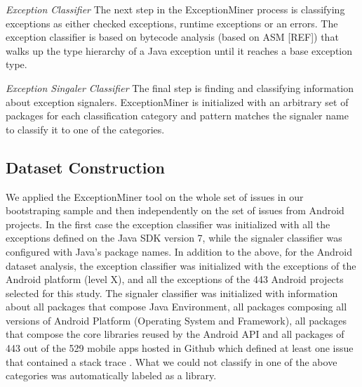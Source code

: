 \documentclass[conference]{IEEEtran}
\begin{document}


\noindent\emph{Exception Classifier} The next step in the ExceptionMiner process is classifying exceptions as either checked exceptions, runtime exceptions or an errors. The exception classifier
is based on bytecode analysis (based on ASM [REF]) that walks up the type hierarchy of a Java exception until it reaches a base exception type. 

\noindent\emph{Exception Singaler Classifier} The final step is finding and classifying 
information about exception signalers. ExceptionMiner is initialized with an arbitrary 
set of packages for each classification category and pattern matches the signaler name
to classify it to one of the categories. 

\subsection{Dataset Construction}
\label{sec:datasetcons}

We applied the ExceptionMiner tool on the whole set of issues in our bootstraping sample
and then independently on the set of issues from Android projects. 
In the first case the exception classifier was initialized with all the exceptions defined on
the Java SDK version 7, while the signaler classifier was configured with Java's package
names.
In addition to the above, for the Android dataset analysis, the exception classifier
was initialized with the exceptions of the Android 
platform (level X), and all the exceptions of the 443 Android projects selected for this study.
The signaler classifier was initialized with information
about all packages that compose Java Environment, all packages composing all versions of Android Platform (Operating System and Framework), all packages that compose the core libraries reused by the Android API and all packages of 443 out of the 529 mobile apps hosted in Github which defined at least one issue that contained a stack trace .
What we could not classify in one of the above categories was automatically labeled as a library.
\end{document}
